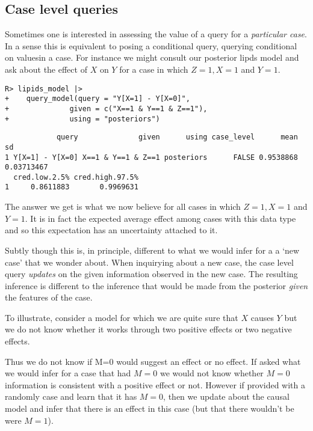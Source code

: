 \documentclass[
  11pt,
  article]{jss}
\begin{document}
\hypertarget{case-level-queries}{%
\subsection{Case level queries}\label{case-level-queries}}

Sometimes one is interested in assessing the value of a query for a
\emph{particular case}. In a sense this is equivalent to posing a
conditional query, querying conditional on valuesin a case. For instance
we might consult our posterior lipds model and ask about the effect of
\(X\) on \(Y\) for a case in which \(Z=1, X=1\) and \(Y=1\).

\begin{verbatim}
R> lipids_model |>
+    query_model(query = "Y[X=1] - Y[X=0]",
+              given = c("X==1 & Y==1 & Z==1"),
+              using = "posteriors")
\end{verbatim}

\begin{verbatim}
            query              given      using case_level      mean         sd
1 Y[X=1] - Y[X=0] X==1 & Y==1 & Z==1 posteriors      FALSE 0.9538868 0.03713467
  cred.low.2.5% cred.high.97.5%
1     0.8611883       0.9969631
\end{verbatim}

The answer we get is what we now believe for all cases in which
\(Z=1, X=1\) and \(Y=1\). It is in fact the expected average effect
among cases with this data type and so this expectation has an
uncertainty attached to it.

Subtly though this is, in principle, different to what we would infer
for a a `new case' that we wonder about. When inquirying about a new
case, the case level query \emph{updates} on the given information
observed in the new case. The resulting inference is different to the
inference that would be made from the posterior \emph{given} the
features of the case.

To illustrate, consider a model for which we are quite sure that \(X\)
causes \(Y\) but we do not know whether it works through two positive
effects or two negative effects.

Thus we do not know if M=0 would suggest an effect or no effect. If
asked what we would infer for a case that had \(M=0\) we would not know
whether \(M=0\) information is consistent with a positive effect or not.
However if provided with a randomly case and learn that it has \(M=0\),
then we update about the causal model and infer that there is an effect
in this case (but that there wouldn't be were \(M=1\)).
\end{document}
